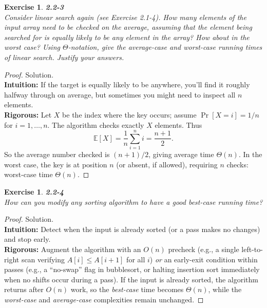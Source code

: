 \documentclass[12pt]{article}
\newtheorem{exercise}[theorem]{Exercise}
\theoremstyle{definition}
\begin{document}
\newpage

\begin{exercise}
\noindent
\textbf{2.2-3}\\
\noindent
Consider linear search again (see Exercise 2.1-4). How many elements of the input array need to be
checked on the average, assuming that the element being searched for is equally likely to be any
element in the array? How about in the worst case? Using $\Theta$-notation, give the average-case
and worst-case running times of linear search. Justify your answers.
\end{exercise}

\vspace{1pt}

\begin{proof}
Solution.\\

\noindent
\textbf{Intuition:} If the target is equally likely to be anywhere, you’ll find it roughly halfway
through on average, but sometimes you might need to inspect all $n$ elements.\\

\noindent
\textbf{Rigorous:} Let $X$ be the index where the key occurs; assume $\Pr[X=i]=1/n$ for $i=1,\dots,n$.
The algorithm checks exactly $X$ elements. Thus
\[
\mathbb{E}[X] = \frac{1}{n}\sum_{i=1}^{n} i = \frac{n+1}{2}.
\]
So the average number checked is $(n+1)/2$, giving average time $\Theta(n)$.
In the worst case, the key is at position $n$ (or absent, if allowed), requiring $n$ checks:
worst-case time $\Theta(n)$.
\end{proof}

\newpage

\begin{exercise}
\noindent
\textbf{2.2-4}\\
\noindent
How can you modify any sorting algorithm to have a good best-case running time?
\end{exercise}

\vspace{1pt}

\begin{proof}
Solution.\\

\noindent
\textbf{Intuition:} Detect when the input is already sorted (or a pass makes no changes) and stop early.\\

\noindent
\textbf{Rigorous:} Augment the algorithm with an $O(n)$ precheck (e.g., a single left-to-right scan
verifying $A[i]\le A[i+1]$ for all $i$) \emph{or} an early-exit condition within passes (e.g., a “no-swap”
flag in bubblesort, or halting insertion sort immediately when no shifts occur during a pass).
If the input is already sorted, the algorithm returns after $O(n)$ work, so the \emph{best-case} time
becomes $\Theta(n)$, while the \emph{worst-case} and \emph{average-case} complexities remain unchanged.
\end{proof}
\end{document}
